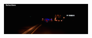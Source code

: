 \begin{multicols}{2}
\begin{figure}[H]
  \centering
  \includegraphics[width=0.4\textwidth]{text/figures/distanceCarEvent.png}
  \label{systemOverview::distanceToVehicle}
\end{figure}
\end{multicols}
\vspace*{1pt}